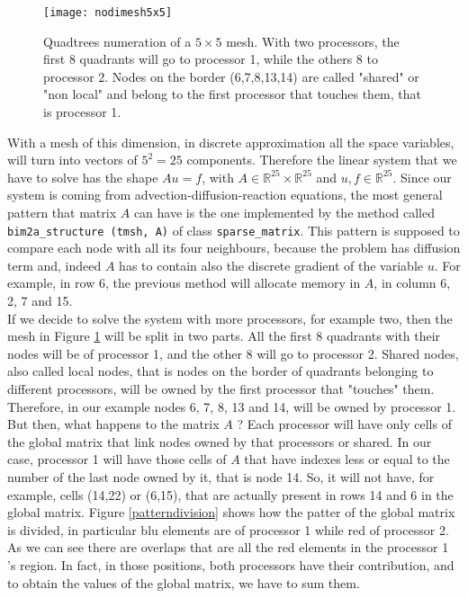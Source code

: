 \begin{figure}[h]
	
	\centering
	\texttt{[image: nodimesh5x5]}
	\caption[Quadtrees numeration of nodes for a mesh $ 5 \times 5 $]{Quadtrees numeration of a $ 5 \times 5 $ mesh. With two processors, the first 8 quadrants will go to processor 1, while the others 8 to processor 2. Nodes on the border (6,7,8,13,14) are called "shared" or "non local" and belong to the first processor that touches them, that is processor 1.}
	\label{nodimesh5x5}
\end{figure}
With a mesh of this dimension, in discrete approximation all the space variables, will turn into  vectors of $ 5^2 = 25 $ components. Therefore the linear system that we have to solve has the shape $ A u = f $, with $ A \in \mathbb{R}^{25} \times \mathbb{R}^{25} $ and  $ u,f \in \mathbb{R}^{25} $. Since our system is coming from advection-diffusion-reaction equations, the most general pattern that matrix $ A $ can have is the one implemented by the method  called \texttt{bim2a\_structure (tmsh, A)} of class \texttt{sparse\_matrix}. This pattern is supposed to compare each node with all its four neighbours, because the problem has diffusion term and, indeed $ A $ has to contain also the discrete gradient of the variable $ u $. For example, in row 6, the previous method will allocate memory in $ A $, in column 6, 2, 7 and 15.\\
If we decide to solve the system with more processors, for example two, then the mesh in Figure \ref{nodimesh5x5} will be split in two parts. All the first 8 quadrants with their nodes will be of processor 1, and the other 8 will go to processor 2. Shared nodes, also called local nodes, that is nodes on the border of quadrants belonging to different processors, will be owned by the first processor that "touches" them. Therefore, in our example nodes 6, 7, 8, 13 and 14, will be owned by processor 1. But then, what happens to the matrix $ A $ ? Each processor will have only cells of the global matrix that link nodes owned by that processors or shared. In our case, processor 1 will have those cells of $ A $ that have indexes less or equal to the number of the last node owned by it, that is node 14. So, it will not have, for example, cells (14,22) or (6,15), that are actually present in rows 14 and 6 in the global matrix.
Figure \ref{patterndivision} shows how the patter of the global matrix is divided, in particular blu elements are of processor 1 while red of processor 2. As we can see there are overlaps that are all the red elements in the processor 1 's region. In fact, in those positions, both processors have their contribution, and to obtain the values of the global matrix, we have to sum them.\\
